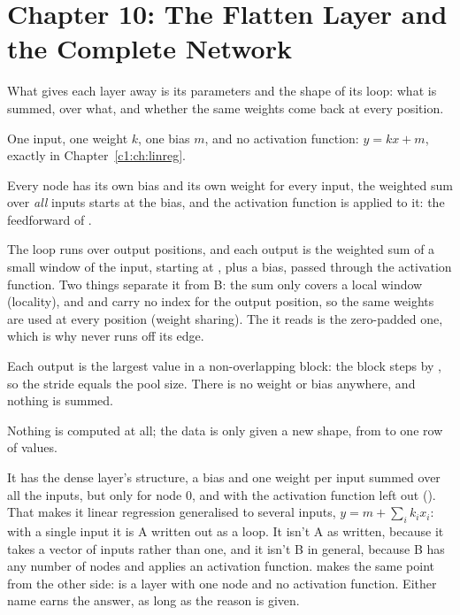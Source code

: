 
\section{Chapter 10: The Flatten Layer and the Complete Network}
\label{sol:sec:c10}

What gives each layer away is its parameters and the shape of its loop: what is summed, over what,
and whether the same weights come back at every position.

One input, one weight $k$, one bias $m$, and no activation function: $y = kx + m$, exactly
 in Chapter~\ref{c1:ch:linreg}.

Every node  has its own bias and its own weight for every input, the weighted sum over
\emph{all} inputs starts at the bias, and the activation function is applied to it: the
feedforward of .

The loop runs over output positions, and each output is the weighted sum of a small
 window of the input, starting at , plus a bias,
passed through the activation function. Two things separate it from B: the sum only covers a local
window (locality), and  and  carry no index for the output position, so
the same weights are used at every position (weight sharing). The  it reads is the
zero-padded one, which is why  never runs off its edge.

Each output is the largest value in a non-overlapping  block: the block
steps by , so the stride equals the pool size. There is no weight or bias anywhere,
and nothing is summed.

Nothing is computed at all; the data is only given a new shape, from  to one
row of  values.

It has the dense layer's structure, a bias and one weight per input summed over all the inputs,
but only for node 0, and with the activation function left out (). That makes
it linear regression generalised to several inputs, $y = m + \sum_i k_i x_i$: with a single input
it is A written out as a loop. It isn't A as written, because it takes a vector of inputs rather
than one, and it isn't B in general, because B has any number of nodes and applies an activation
function.  makes the same point from the other side:  is a
 layer with one node and no activation function. Either name earns the answer, as long
as the reason is given.

